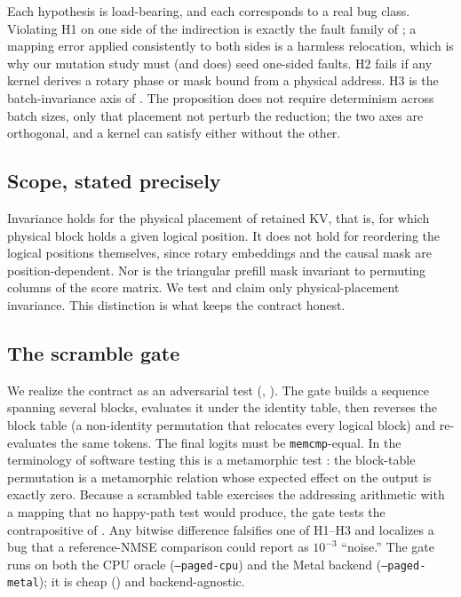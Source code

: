 \documentclass[sigconf,nonacm,screen]{acmart}
\newcommand{\code}[1]{\texttt{\small #1}}
\begin{document}
Each hypothesis is load-bearing, and each corresponds to a real bug class.
Violating H1 on one side of the indirection is exactly the fault family of
; a mapping error applied consistently to both sides is a
harmless relocation, which is why our mutation study must (and does) seed
one-sided faults. H2 fails if any kernel derives a rotary phase or mask
bound from a physical address. H3 is the batch-invariance axis of
\citet{he2025defeating}. The proposition does not require determinism across
batch sizes, only that placement not perturb the reduction; the two axes are
orthogonal, and a kernel can satisfy either without the other.

\subsection{Scope, stated precisely}
Invariance holds for the physical placement of retained KV, that is, for
which physical block holds a given logical position. It does not hold for
reordering the logical positions themselves, since rotary embeddings and the
causal mask are position-dependent. Nor is the triangular prefill mask
invariant to permuting columns of the score matrix. We test and claim only
physical-placement invariance. This distinction is what keeps the contract
honest.

\subsection{The scramble gate}
\label{sec:vpa-gate}
We realize the contract as an adversarial test (,
). The gate builds a sequence spanning several blocks,
evaluates it under the identity table, then reverses the block table (a
non-identity permutation that relocates every logical block) and re-evaluates
the same tokens. The final logits must be \code{memcmp}-equal. In the
terminology of software testing this is a metamorphic test
\citep{chen2018metamorphic}: the block-table permutation is a metamorphic
relation whose expected effect on the output is exactly zero. Because a
scrambled table exercises the addressing arithmetic with a mapping that no
happy-path test would produce, the gate tests the contrapositive of
. Any bitwise difference falsifies one of H1--H3 and
localizes a bug that a reference-NMSE comparison could report as $10^{-3}$
``noise.'' The gate runs on both the CPU oracle (\code{--paged-cpu}) and the
Metal backend (\code{--paged-metal}); it is cheap () and
backend-agnostic.
\end{document}
